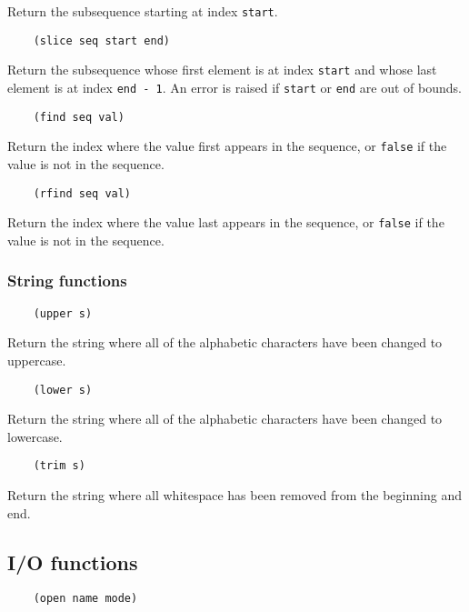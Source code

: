 \documentclass{article}
\newcommand{\inlinecode}{\texttt}
\begin{document}
Return the subsequence starting at index \inlinecode{start}.

\begin{verbatim}
    (slice seq start end)
\end{verbatim}

Return the subsequence whose first element is at index \inlinecode{start} and whose last element is at index \inlinecode{end - 1}. An error is raised if \inlinecode{start} or \inlinecode{end} are out of bounds.

\begin{verbatim}
    (find seq val)
\end{verbatim}

Return the index where the value first appears in the sequence, or \inlinecode{false} if the value is not in the sequence.

\begin{verbatim}
    (rfind seq val)
\end{verbatim}

Return the index where the value last appears in the sequence, or \inlinecode{false} if the value is not in the sequence.

\subsubsection{String functions}
\begin{verbatim}
    (upper s)
\end{verbatim}

Return the string where all of the alphabetic characters have been changed to uppercase.

\begin{verbatim}
    (lower s)
\end{verbatim}

Return the string where all of the alphabetic characters have been changed to lowercase.

\begin{verbatim}
    (trim s)
\end{verbatim}

Return the string where all whitespace has been removed from the beginning and end.

\subsection{I/O functions}
\begin{verbatim}
    (open name mode)
\end{verbatim}
\end{document}
